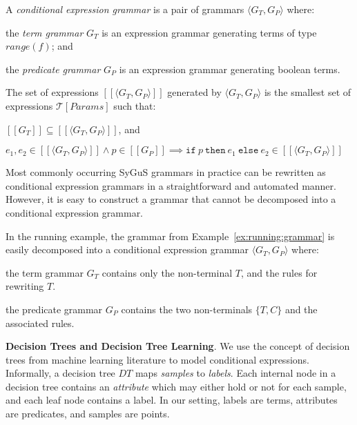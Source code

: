 \documentclass{llncs}
\newcommand\tuple[1]{\langle #1 \rangle}
\newcommand\Expr{e}
\newcommand\Pred{p}
\newcommand\Grammar{G}
\newcommand\sem[1]{[\![ #1 ]\!]}
\newcommand\SynthFun{f}
\newcommand\range{\mathit{range}}
\newcommand\FormalParameters{\mathit{Params}}
\newcommand\Theory{\mathcal{T}}
\newcommand\ITE[3]{\mathtt{if}~#1~\mathtt{then}~#2~\mathtt{else}~#3}
\newcommand\DecisionTree{\mathit{DT}}
\renewcommand{\paragraph}[1]{\par\noindent\textbf{#1}.}
\begin{document}
A {\em conditional expression grammar} is a pair of grammars $\tuple{
\Grammar_T, \Grammar_P }$ where:
\begin{inparaenum}[(a)]
\item the {\em term grammar} $\Grammar_T$ is an expression grammar
  generating terms of type $\range(\SynthFun)$; and
\item the {\em predicate grammar} $\Grammar_P$ is an expression
  grammar generating boolean terms.
\end{inparaenum}
The set of expressions $\sem{\tuple{ \Grammar_T, \Grammar_P }}$
generated by $\tuple{ G_T, G_P }$ is the smallest set of expressions
$\Theory[\FormalParameters]$ such that:
\begin{inparaenum}[(a)]
\item $\sem{\Grammar_T} \subseteq \sem{\tuple{ \Grammar_T, \Grammar_P
  }}$, and
\item $\Expr_1, \Expr_2 \in \sem{\tuple{ \Grammar_T, \Grammar_P }}
  \wedge \Pred \in \sem{\Grammar_P} \implies
  \ITE{\Pred}{\Expr_1}{\Expr_2} \in \sem{\tuple{ \Grammar_T, \Grammar_P }}$
\end{inparaenum}

Most commonly occurring SyGuS grammars in practice can be rewritten
as conditional expression grammars in a straightforward and automated
manner.
However, it is easy to construct a grammar that cannot be decomposed
into a conditional expression grammar.

\begin{example}
  In the running example, the grammar from
  Example~\ref{ex:running:grammar} is easily decomposed into a
  conditional expression grammar $\tuple{\Grammar_T, \Grammar_P}$ where:
  \begin{inparaenum}[(a)]
  \item the term grammar $\Grammar_T$ contains only the non-terminal
    $T$, and the rules for rewriting $T$.
  \item the predicate grammar $\Grammar_P$ contains the two
    non-terminals $\{ T, C \}$ and the associated rules.
  \end{inparaenum}
\end{example}

\paragraph{Decision Trees and Decision Tree Learning}
We use the concept of decision trees from machine learning literature to
model conditional expressions.
Informally, a decision tree $\DecisionTree$ maps {\em samples} to {\em
labels}.
Each internal node in a decision tree contains an {\em attribute} which
may either hold or not for each sample, and each leaf node contains a
label.
In our setting, labels are terms, attributes are predicates, and samples
are points.
\end{document}
